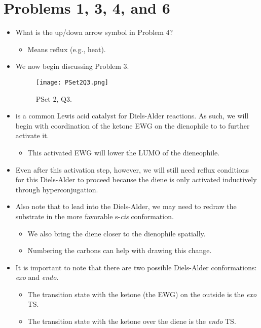 \documentclass[../notes.tex]{subfiles}
\begin{document}
\section{Problems 1, 3, 4, and 6}
\begin{itemize}
    \item {}What is the up/down arrow symbol in Problem 4?
    \begin{itemize}
        \item Means reflux (e.g., heat).
    \end{itemize}
    \item We now begin discussing Problem 3.
    \begin{figure}[h!]
        \centering
        \texttt{[image: PSet2Q3.png]}
        \caption{PSet 2, Q3.}
        \label{fig:PSet2Q3}
    \end{figure}
    \item {} is a common Lewis acid catalyst for Diels-Alder reactions. As such, we will begin with coordination of the ketone EWG on the dienophile to  to further activate it.
    \begin{itemize}
        \item This activated EWG will lower the LUMO of the dieneophile.
    \end{itemize}
    \item Even after this activation step, however, we will still need reflux conditions for this Diels-Alder to proceed because the diene is only activated inductively through hyperconjugation.
    \item Also note that to lead into the Diels-Alder, we may need to redraw the substrate in the more favorable s-\emph{cis} conformation.
    \begin{itemize}
        \item We also bring the diene closer to the dienophile spatially.
        \item Numbering the carbons can help with drawing this change.
    \end{itemize}
    \item It is important to note that there are two possible Diels-Alder conformations: \emph{exo} and \emph{endo}.
    \begin{itemize}
        \item The transition state with the ketone (the EWG) on the outside is the \emph{exo} TS.
        \item The transition state with the ketone over the diene is the \emph{endo} TS.

\end{itemize}
\end{itemize}
\end{document}

